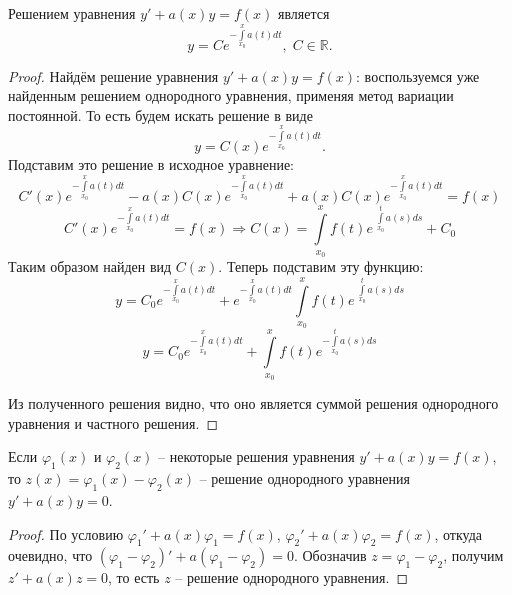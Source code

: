     \begin{proposition}
        Решением уравнения $y' + a(x) y = f(x)$ является
        \begin{equation*}
            y = C e^{-\int\limits_{x_0}^{x} a(t) dt}, \; C \in \mathbb{R}.
        \end{equation*}
    \end{proposition}

    \begin{proof}
        Найдём решение уравнения $y' + a(x) y = f(x)$: воспользуемся уже найденным решением однородного уравнения, применяя метод вариации постоянной. То есть будем искать решение в виде
        \begin{equation*}
            y = C(x) e^{-\int\limits_{x_0}^{x} a(t) dt}.
        \end{equation*}
        Подставим это решение в исходное уравнение:
        \begin{equation*}
            C'(x) e^{-\int\limits_{x_0}^{x} a(t) dt} - a(x) C(x) e^{-\int\limits_{x_0}^{x} a(t) dt} + a(x) C(x) e^{-\int\limits_{x_0}^{x} a(t) dt} = f(x)
        \end{equation*}
        \begin{equation*}
            C'(x) e^{-\int\limits_{x_0}^{x} a(t) dt} = f(x) \Rightarrow C(x) = \int\limits_{x_0}^{x} f(t) e^{\; \int\limits_{x_0}^{t} a(s) ds} + C_0
        \end{equation*}
        Таким образом найден вид $C(x)$. Теперь подставим эту функцию:
        \begin{equation*}
            y = C_0 e^{-\int\limits_{x_0}^{x} a(t) dt} + e^{-\int\limits_{x_0}^{x} a(t) dt} \int\limits_{x_0}^{x} f(t) e^{\; \int\limits_{x_0}^{t} a(s) ds}
        \end{equation*}
        \begin{equation*}
            y = C_0 e^{-\int\limits_{x_0}^{x} a(t) dt} + \int\limits_{x_0}^{x} f(t) e^{- \int\limits_{x_0}^{t} a(s) ds}
        \end{equation*}
        
        Из полученного решения видно, что оно является суммой решения однородного уравнения и частного решения. 
    \end{proof}

    \begin{proposition}
        Если $\varphi_1(x)$ и $\varphi_2(x)$ -- некоторые решения уравнения $y' + a(x) y = f(x)$, то $z(x) = \varphi_1(x) - \varphi_2(x)$ -- решение однородного уравнения $y' + a(x) y = 0$.
    \end{proposition}

    \begin{proof}
        По условию $\varphi_1' + a(x) \varphi_1 = f(x)$, $\varphi_2' + a(x) \varphi_2 = f(x)$, откуда очевидно, что $(\varphi_1 - \varphi_2)' + a (\varphi_1 - \varphi_2) = 0$. Обозначив $z = \varphi_1 - \varphi_2$, получим $z' + a(x) z = 0$, то есть $z$ -- решение однородного уравнения.
    \end{proof}
    

